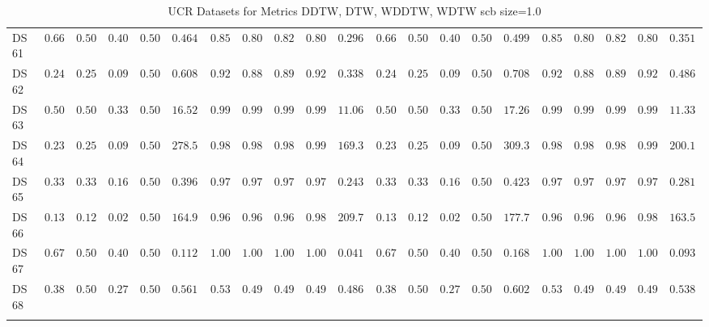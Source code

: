 {\begin{longtable}{|l|ccccc|ccccc|ccccc|ccccc|}
		DS 61 & $0.6667$ & $0.5000$ & $0.4000$ & $0.5000$ & $0.4641$ & $0.8571$ & $0.8036$ & $0.8250$ & $0.8036$ & $\boldsymbol{0.2964}$ & $0.6667$ & $0.5000$ & $0.4000$ & $0.5000$ & $0.4995$ & $0.8571$ & $0.8036$ & $0.8250$ & $0.8036$ & $0.3512$ \\
		DS 62 & $0.2400$ & $0.2500$ & $0.0968$ & $0.5000$ & $0.6089$ & $0.9200$ & $0.8854$ & $0.8969$ & $0.9236$ & $\boldsymbol{0.3384}$ & $0.2400$ & $0.2500$ & $0.0968$ & $0.5000$ & $0.7082$ & $0.9200$ & $0.8854$ & $0.8969$ & $0.9236$ & $0.4869$ \\
		DS 63 & $0.5052$ & $0.5000$ & $0.3356$ & $0.5000$ & $16.5280$ & $0.9966$ & $0.9965$ & $0.9966$ & $0.9965$ & $\boldsymbol{11.0643}$ & $0.5052$ & $0.5000$ & $0.3356$ & $0.5000$ & $17.2667$ & $0.9966$ & $0.9965$ & $0.9966$ & $0.9965$ & $11.3364$ \\
		DS 64 & $0.2376$ & $0.2500$ & $0.0960$ & $0.5000$ & $278.5848$ & $0.9872$ & $0.9871$ & $0.9871$ & $0.9914$ & $\boldsymbol{169.3093}$ & $0.2376$ & $0.2500$ & $0.0960$ & $0.5000$ & $309.3026$ & $0.9872$ & $0.9871$ & $0.9871$ & $0.9914$ & $200.1651$ \\
		DS 65 & $0.3333$ & $0.3333$ & $0.1667$ & $0.5000$ & $0.3965$ & $0.9778$ & $0.9722$ & $0.9748$ & $0.9792$ & $\boldsymbol{0.2434}$ & $0.3333$ & $0.3333$ & $0.1667$ & $0.5000$ & $0.4233$ & $0.9778$ & $0.9722$ & $0.9748$ & $0.9792$ & $0.2815$ \\
		DS 66 & $0.1304$ & $0.1250$ & $0.0288$ & $0.5000$ & $164.9483$ & $0.9661$ & $0.9657$ & $0.9660$ & $0.9804$ & $209.7475$ & $0.1304$ & $0.1250$ & $0.0288$ & $0.5000$ & $177.7675$ & $0.9661$ & $0.9657$ & $0.9660$ & $0.9804$ & $\boldsymbol{163.5195}$ \\
		DS 67 & $0.6786$ & $0.5000$ & $0.4043$ & $0.5000$ & $0.1123$ & $1.0000$ & $1.0000$ & $1.0000$ & $1.0000$ & $\boldsymbol{0.0418}$ & $0.6786$ & $0.5000$ & $0.4043$ & $0.5000$ & $0.1681$ & $\boldsymbol{1.0000}$ & $\boldsymbol{1.0000}$ & $\boldsymbol{1.0000}$ & $\boldsymbol{1.0000}$ & $0.0931$ \\
		DS 68 & $0.3846$ & $0.5000$ & $0.2778$ & $0.5000$ & $0.5616$ & $0.5385$ & $0.4975$ & $0.4953$ & $0.4975$ & $\boldsymbol{0.4864}$ & $0.3846$ & $0.5000$ & $0.2778$ & $0.5000$ & $0.6026$ & $0.5385$ & $0.4975$ & $0.4953$ & $0.4975$ & $0.5388$ \\
		\hline
		\caption{UCR Datasets for Metrics DDTW, DTW, WDDTW, WDTW \gls{scb} size=1.0}
		\label{tab:UCR_ddtw-dtw-wddtw-wdtw_scb_size=1.0}
	\end{longtable}
}
